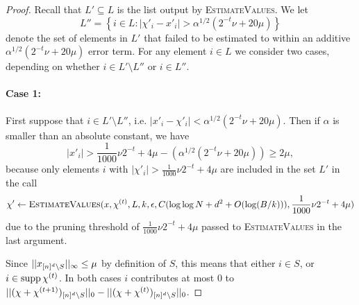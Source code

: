 \begin{proof}
Recall that $L'\subseteq L$ is the list output by \textsc{EstimateValues}. We let 
$$
L''=\left\{i\in L: |\chi'_i-x'_i|>\alpha^{1/2}\left(2^{-t}\nu+20\mu\right)\right\}
$$ denote the set of elements in $L'$ that failed to be estimated to within an additive $\alpha^{1/2}\left(2^{-t}\nu+20\mu\right)$ error term. 
For any element $i\in L$ we consider two cases, depending on whether $i\in L'\setminus L''$ or $i\in L''$.

\paragraph{Case 1:} First suppose that $i\in L'\setminus L''$, i.e. $|x'_i-\chi'_i|<\alpha^{1/2}(2^{-t}\nu+20\mu)$. Then if $\alpha$ is smaller than an absolute constant, we have
$$
|x'_i|>\frac1{1000}\nu 2^{-t}+4\mu-(\alpha^{1/2}(2^{-t}\nu+20\mu))\geq 2\mu,
$$
because only elements $i$ with $|\chi'_i|>\frac1{1000}\nu 2^{-t}+4\mu$ are included in the set $L'$ in the call 
$$
\chi' \gets \Call{EstimateValues}{x,  \chi^{(t)}, L, k, \e, C(\log\log N+d^2+O(\log (B/k))), \frac1{1000}\nu 2^{-t}+4\mu}
$$ 
due to the pruning threshold of $\frac1{1000}\nu 2^{-t}+4\mu$ passed to \textsc{EstimateValues} in the last argument. 

Since $||x_{{[n]^d}\setminus S}||_\infty\leq \mu$ by definition of $S$, this means that either $i\in S$, or $i\in \operatorname{supp} \chi^{(t)}$. In both cases $i$ contributes at most $0$ to  
$||(\chi+\chi^{(t+1)})_{{[n]^d}\setminus S}||_0-||(\chi+\chi^{(t)})_{{[n]^d}\setminus S}||_0$.


\end{proof}
